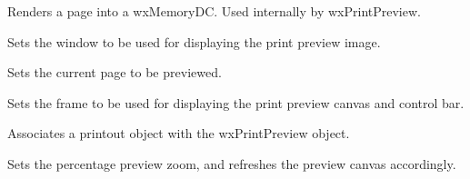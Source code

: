 \label{wxprintpreviewrenderpage}


Renders a page into a wxMemoryDC. Used internally by wxPrintPreview.


\label{wxprintpreviewsetcanvas}


Sets the window to be used for displaying the print preview image.


\label{wxprintpreviewsetcurrentpage}


Sets the current page to be previewed.


\label{wxprintpreviewsetframe}


Sets the frame to be used for displaying the print preview canvas
and control bar.


\label{wxprintpreviewsetprintout}


Associates a printout object with the wxPrintPreview object.


\label{wxprintpreviewsetzoom}


Sets the percentage preview zoom, and refreshes the preview canvas
accordingly.

